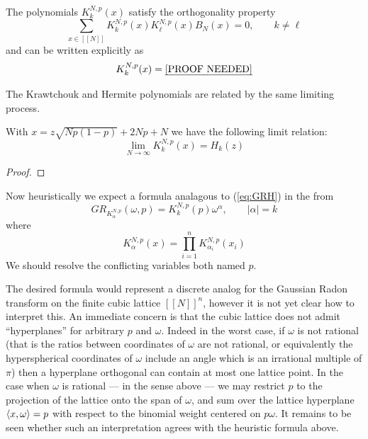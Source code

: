 The polynomials $K^{N,p}_k(x)$ satisfy the orthogonality property
\[
  \sum_{x \in [[N]]} K^{N,p}_k(x) K^{N,p}_\ell(x) B_N(x) = 0, \qquad k \neq \ell
\]
and can be written explicitly as
\[
  K^{N,p}_k(x) = \text{\emph{[PROOF NEEDED]}}
\]

The Krawtchouk and Hermite polynomials are related by the same limiting process.
\begin{proposition}
  With $x = z \sqrt{Np(1-p)} + 2Np + N$ we have the following limit relation:
  \[
    \lim_{N \rightarrow \infty} K^{N,p}_k(x) = H_k(z)
  \]
\end{proposition}

\begin{proof}
  \pn
\end{proof}

Now heuristically we expect a formula analagous to (\ref{eq:GRH}) in the from
\[
  GR_{K^{N,p}_\alpha}(\omega, p) = K^{N,p}_k(p)\omega^\alpha, \qquad |\alpha| = k
\]
where 
\[
  K^{N,p}_\alpha(x) = \prod_{i = 1}^n K^{N,p}_{\alpha_i}(x_i)
\]
We should resolve the conflicting variables both named $p$.

The desired formula would represent a discrete analog for the Gaussian Radon transform on the finite cubic lattice $[[N]]^n$, however it is not yet clear how to interpret this. An immediate concern is that the cubic lattice does not admit ``hyperplanes'' for arbitrary $p$ and $\omega$. Indeed in the worst case, if $\omega$ is not rational (that is the ratios between coordinates of $\omega$ are not rational, or equivalently the hyperspherical coordinates of $\omega$ include an angle which is an irrational multiple of $\pi$) then a hyperplane orthogonal can contain at most one lattice point. In the case when $\omega$ is rational — in the sense above — we may restrict $p$ to the projection of the lattice onto the span of $\omega$, and sum over the lattice hyperplane $\left\langle x, \omega \right\rangle = p$ with respect to the binomial weight centered on $p\omega$. It remains to be seen whether such an interpretation agrees with the heuristic formula above.



